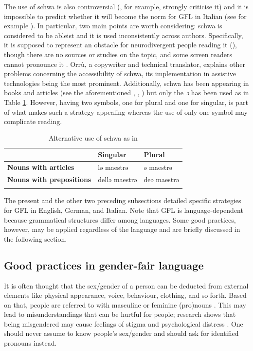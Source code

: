 The use of schwa is also controversial (\cite{cosinonschwa,linguascema}, for example, strongly criticise it) and it is impossible to predict whether it will become the norm for GFL in Italian (see for example \cite{gheno2021schwa}). In particular, two main points are worth considering: schwa is considered to be ableist and it is used inconsistently across authors. Specifically, it is supposed to represent an obstacle for neurodivergent people reading it (\cite{gheno2021schwa}), though there are no sources or studies on the topic, and some screen readers cannot pronounce it \citep{orrù2021schwa}. Orrù, a copywriter and technical translator, explains other problems concerning the accessibility of schwa, its implementation in assistive technologies being the most prominent. Additionally, schwa has been appearing in books and articles (see the aforementioned \cite{effequschwa}, \cite{meloni2021belle}, \cite{murgia2021espresso}) but only the \textit{ə} has been used as in Table \ref{tab:alternativeschwa}. However, having two symbols, one for plural and one for singular, is part of what makes such a strategy appealing whereas the use of only one symbol may complicate reading. 

\begin{table}
    \caption[Alternative use of schwa]{Alternative use of schwa as in \textcite{effequschwanorme}}
    \label{tab:alternativeschwa}
    \begin{tabular}{lll}
    \lsptoprule
        & \textbf{Singular} & \textbf{Plural}  \\
\midrule
        \textbf{Nouns with articles} & lə maestrə &  ə maestrə \\
        \textbf{Nouns with prepositions} & dellə maestrə & deə maestrə \\
\lspbottomrule
    \end{tabular}
\end{table}

The present and the other two preceding subsections detailed specific strategies for GFL in English, German, and Italian. Note that GFL is language-dependent because grammatical structures differ among languages. Some good practices, however, may be applied regardless of the language and are briefly discussed in the following section. 
\subsection{Good practices in gender-fair language}
It is often thought that the sex/gender of a person can be deducted from external elements like physical appearance, voice, behaviour, clothing, and so forth. Based on that, people are referred to with masculine or feminine (pro)nouns \citep[32]{prona2016mein}. This may lead to misunderstandings that can be hurtful for people; research shows that being misgendered may cause feelings of stigma and psychological distress \citep{mclemore2018minority}. One should never assume to know people's sex/gender and should ask for identified pronouns instead. 

